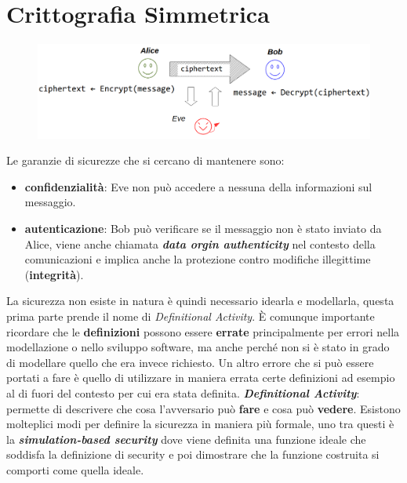 \chapter{Crittografia Simmetrica}

\begin{figure}[h]
    \centering
    \includegraphics[width=\textwidth]{img/crypto_symm_1.png}
\end{figure}

Le garanzie di sicurezze che si cercano di mantenere sono:
\begin{itemize}[nosep]
    \item \textbf{confidenzialità}: Eve non può accedere a nessuna della informazioni sul messaggio.
    \item \textbf{autenticazione}: Bob può verificare se il messaggio non è stato inviato da Alice, viene anche chiamata \textbf{\textit{data orgin authenticity}} nel contesto della comunicazioni e implica anche la protezione contro modifiche illegittime (\textbf{integrità}).
\end{itemize}

\begin{flushleft}
    La sicurezza non esiste in natura è quindi necessario idearla e modellarla, questa prima parte prende il nome di \textit{Definitional Activity}. È comunque importante ricordare che le \textbf{definizioni} possono essere \textbf{errate} principalmente per errori nella modellazione o nello sviluppo software, ma anche perché non si è stato in grado di modellare quello che era invece richiesto. Un altro errore che si può essere portati a fare è quello di utilizzare in maniera errata certe definizioni ad esempio al di fuori del contesto per cui era stata definita. \newline
    \textbf{\textit{Definitional Activity}}: permette di descrivere che cosa l'avversario può \textbf{fare} e cosa può \textbf{vedere}. Esistono molteplici modi per definire la sicurezza in maniera più formale, uno tra questi è la \textbf{\textit{simulation-based security}} dove viene definita una funzione ideale che soddisfa la definizione di security e poi dimostrare che la funzione costruita si comporti come quella ideale.
\end{flushleft}


